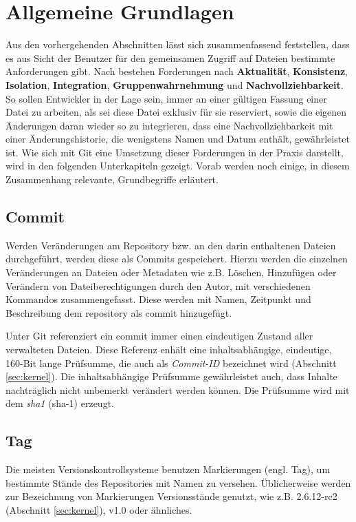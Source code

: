 \section{Allgemeine Grundlagen}\label{sec:Grundlagen}
Aus den vorhergehenden Abschnitten lässt sich zusammenfassend feststellen, dass
es aus Sicht der Benutzer für den gemeinsamen Zugriff auf Dateien bestimmte
Anforderungen gibt. Nach \cite[S.~37]{hagen:1678} bestehen Forderungen nach
\textbf{Aktualität}, \textbf{Konsistenz}, \textbf{Isolation},
\textbf{Integration}, \textbf{Gruppenwahrnehmung} und
\textbf{Nachvollziehbarkeit}. So sollen Entwickler in der Lage sein, immer an
einer gültigen Fassung einer Datei zu arbeiten, als sei diese Datei exklusiv für
sie reserviert, sowie die eigenen Änderungen daran wieder so zu integrieren, dass
eine Nachvollziehbarkeit mit einer Änderungshistorie, die wenigstens Namen und
Datum enthält, gewährleistet ist. Wie sich mit Git eine Umsetzung dieser
Forderungen in der Praxis darstellt, wird in den folgenden Unterkapiteln
gezeigt. Vorab werden noch einige, in diesem Zusammenhang relevante,
Grundbegriffe erläutert.

\subsection{Commit}\label{sec:commit}
Werden Veränderungen am Repository bzw. an den darin enthaltenen
Dateien durchgeführt, werden diese als Commits gespeichert. Hierzu werden die einzelnen
Veränderungen an Dateien oder Metadaten wie z.B. Löschen, Hinzufügen oder Verändern
von Dateiberechtigungen durch den Autor, mit verschiedenen Kommandos
zusammengefasst. Diese werden mit Namen, Zeitpunkt und Beschreibung dem
\gls{repository} als \gls{commit} hinzugefügt. \cite[S.~20]{gitosp}

Unter Git referenziert ein \gls{commit} immer einen eindeutigen Zustand aller
verwalteten Dateien. Diese Referenz enhält eine inhaltsabhängige, eindeutige,
160-Bit lange Prüfsumme, die auch als \textit{Commit-ID} bezeichnet
wird (Abschnitt \ref{sec:kernel}). Die inhaltsabhängige Prüfsumme gewährleistet
auch, dass Inhalte nachträglich nicht unbemerkt verändert werden können. Die
Prüfsumme wird mit dem \textit{\gls{sha1}} (\acrshort{sha-1})
erzeugt. \cite[S.~20-21]{gitosp}

\subsection{Tag}\label{sec:tag}
Die meisten Versionskontrollsysteme benutzen Markierungen (engl. Tag), um
bestimmte Stände des Repositories mit Namen zu versehen. Üblicherweise werden
zur Bezeichnung von Markierungen Versionsstände genutzt, wie z.B.
2.6.12-rc2 (Abschnitt \ref{sec:kernel}), v1.0 oder ähnliches. \cite[S.~48]{progit}

